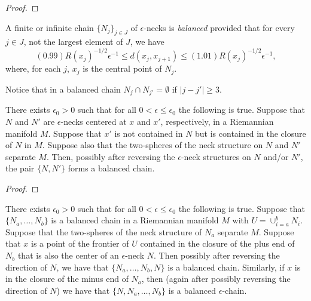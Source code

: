 \begin{proof}
\sketch
{}
\end{proof}

A finite or infinite chain $\{N_j\}_{j\in J}$ of $\epsilon$-necks is
{\em balanced} provided that for every $j\in J$, not the largest
element of $J$, we have
\begin{equation}\label{distineq}
(0.99)R(x_j)^{-1/2}\epsilon^{-1}\le d(x_j,x_{j+1})\le
(1.01)R(x_j)^{-1/2}\epsilon^{-1},
\end{equation}
where, for each $j$, $x_j$ is the central point of $N_j$.


Notice that in a balanced chain $N_j\cap N_{j'}=\emptyset$ if
$|j-j'|\ge 3$.










\begin{lemma}
\label{lem:two-necks-form-balanced-chain}
\label{firstchain}
There exists $\epsilon_0>0$ such that for all $0<\epsilon\le
\epsilon_0$ the following is true.  Suppose that $N$ and $N'$ are
$\epsilon$-necks centered at $x$ and $x'$, respectively, in a
Riemannian manifold $M$. Suppose that $x'$ is not contained in $N$
but is contained in the closure of $N$ in $M$. Suppose also that the
two-spheres of the neck structure on $N$ and $N'$ separate $M$.
Then, possibly after reversing the $\epsilon$-neck structures on $N$
and/or $N'$, the pair $\{N,N'\}$ forms a balanced chain.
\end{lemma}

\begin{proof}
\sketch
{}
\end{proof}




\begin{lemma}
\label{lem:extend-balanced-chain}
\label{addaneck}
There exists $\epsilon_0>0$ such that for all $0<\epsilon\le
\epsilon_0$ the following is true.  Suppose that
$\{N_a,\ldots,N_b\}$ is a balanced chain in a Riemannian manifold
$M$ with $U=\cup_{i=a}^bN_i$. Suppose that the two-spheres of the
neck structure of $N_a$ separate $M$.
 Suppose that $x$
is a point of the frontier of $U$ contained in the closure of the
plus end of $N_b$ that is also the center of an $\epsilon$-neck $N$.
Then possibly after reversing the direction of $N$, we have that
$\{N_a,\ldots,N_b,N\}$ is a balanced chain. Similarly, if $x$ is in
the closure of the minus end of $N_a$, then (again after possibly
reversing the direction of $N$) we have that $\{N,N_a,\ldots,N_b\}$
is a balanced $\epsilon$-chain.
\end{lemma}


